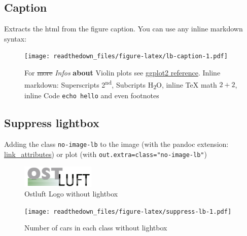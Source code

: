 \documentclass[
]{article}
\begin{document}
\hypertarget{caption}{%
\subsection{Caption}\label{caption}}

Extracts the html from the figure caption. You can use any inline
markdown syntax:

\begin{figure}
\hypertarget{fig:lb-caption}{%
\centering
\texttt{[image: readthedown\_files/figure-latex/lb-caption-1.pdf]}
\caption[For \sout{more} \emph{Infos} \textbf{about} Violin plots see
\href{https://ggplot2.tidyverse.org/reference/geom_violin.html}{ggplot2
reference}. Inline markdown: Superscripts 2\textsuperscript{nd},
Subcripts H\textsubscript{2}O, inline TeX math \(2 + 2\), inline Code
\texttt{echo\ \textquotesingle{}hello\textquotesingle{}} and even
footnotes]{For \sout{more} \emph{Infos} \textbf{about} Violin plots see
\href{https://ggplot2.tidyverse.org/reference/geom_violin.html}{ggplot2
reference}. Inline markdown: Superscripts 2\textsuperscript{nd},
Subcripts H\textsubscript{2}O, inline TeX math \(2 + 2\), inline Code
\texttt{echo\ \textquotesingle{}hello\textquotesingle{}} and even
footnotes\footnotemark{}}\label{fig:lb-caption}
}
\end{figure}

\hypertarget{suppress-lightbox}{%
\subsection{Suppress lightbox}\label{suppress-lightbox}}

Adding the class \texttt{no-image-lb} to the image (with the pandoc
extension:
\href{https://pandoc.org/MANUAL.html\#other-extensions}{link\_attributes})
or plot (with
\texttt{out.extra=\textquotesingle{}class="no-image-lb"\textquotesingle{}})

\begin{figure}
\hypertarget{fig:ol-logo-no-lb}{%
\centering
\includegraphics{ostluft-logo.png}
\caption{Ostluft Logo without lightbox}\label{fig:ol-logo-no-lb}
}
\end{figure}

\begin{figure}
\hypertarget{fig:suppress-lb}{%
\centering
\texttt{[image: readthedown\_files/figure-latex/suppress-lb-1.pdf]}
\caption{Number of cars in each class without
lightbox}\label{fig:suppress-lb}
}
\end{figure}
\end{document}
